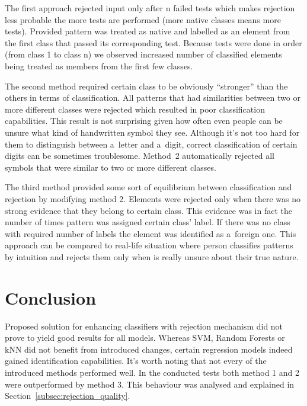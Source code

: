 \documentclass{llncs}
\begin{document}
The first approach rejected input only after n failed tests which makes rejection less probable the more tests are performed (more native classes means more tests). Provided pattern was treated as native and labelled as an element from the first class that passed its corresponding test. Because tests were done in order (from class 1 to class n) we observed increased number of classified elements being treated as members from the first few classes.

The second method required certain class to be obviously ``stronger'' than the others in terms of classification. All patterns that had similarities between two or more different classes were rejected which resulted in poor classification capabilities. This result is not surprising given how often even people can be unsure what kind of handwritten symbol they see. Although it's not too hard for them to distinguish between a~letter and a~digit, correct classification of certain digits can be sometimes troublesome. Method~2 automatically rejected all symbols that were similar to two or more different classes. 

The third method provided some sort of equilibrium between classification and rejection by modifying method 2. Elements were rejected only when there was no strong evidence that they belong to certain class. This evidence was in fact the number of times pattern was assigned certain class' label. If there was no class with required number of labels the element was identified as a~foreign one. This approach can be compared to real-life situation where person classifies patterns by intuition and rejects them only when is really unsure about their true nature. 


\section{Conclusion}
  \label{sec:Conclusion}

Proposed solution for enhancing classifiers with rejection mechanism did not prove to yield good results for all models. Whereas SVM, Random Forests or kNN did not benefit from introduced changes, certain regression models indeed gained identification capabilities. It's worth noting that not every of the introduced methods performed well. In the conducted tests both method 1 and 2 were outperformed by method 3. This behaviour was analysed and explained in Section~\ref{subsec:rejection_quality}. 
\end{document}
